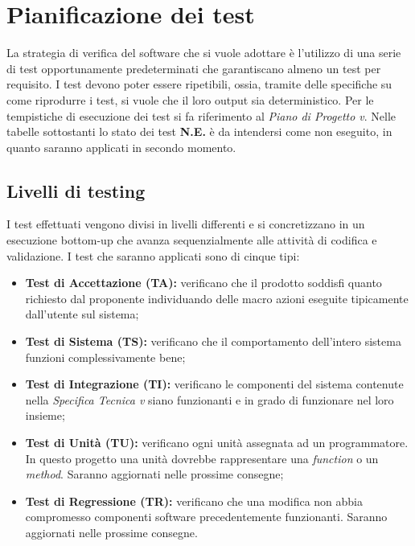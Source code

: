 \def\arraystretch{1.5}
\section{Pianificazione dei test}
La strategia di verifica del software che si vuole adottare è l'utilizzo di una serie di test opportunamente  predeterminati che garantiscano almeno un test per requisito. I test devono poter essere ripetibili, ossia, tramite delle specifiche su come riprodurre i test, si vuole che il loro output sia deterministico. Per le tempistiche di esecuzione dei test si fa riferimento al \emph{Piano di Progetto v}\VersionePP.
Nelle tabelle sottostanti lo stato dei test \textbf{N.E.} è da intendersi come non eseguito, in quanto saranno applicati in secondo momento.

\subsection{Livelli di testing}
I test effettuati vengono divisi in livelli differenti  e si concretizzano in un esecuzione bottom-up che avanza sequenzialmente alle attività di codifica e validazione. I test che saranno applicati sono di cinque tipi:
\begin{itemize}
\item \textbf{Test di Accettazione (TA): } verificano che il prodotto soddisfi quanto richiesto dal proponente individuando delle macro azioni eseguite tipicamente dall'utente sul sistema;
\item \textbf{Test di Sistema (TS): } verificano che il comportamento dell'intero sistema funzioni complessivamente bene;
\item \textbf{Test di Integrazione (TI): } verificano le componenti del sistema contenute nella \emph{Specifica Tecnica v}\VersioneST{} siano funzionanti e in grado di funzionare nel loro insieme;
\item \textbf{Test di Unità (TU): } verificano ogni unità assegnata ad un programmatore. In questo progetto una unità dovrebbe rappresentare una \emph{function} o un \emph{method}. Saranno aggiornati nelle prossime consegne;
\item \textbf{Test di Regressione (TR): } verificano che una modifica non abbia compromesso componenti software precedentemente funzionanti. Saranno aggiornati nelle prossime consegne.
\end{itemize}


